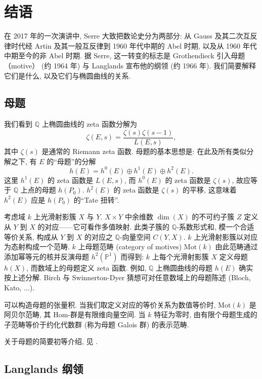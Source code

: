 \section{结语}\label{sec:5.10}

在 2017 年的一次演讲中, Serre 大致把数论史分为两部分: 从 Gauss 及其二次互反律时代经 Artin 及其一般互反律到 1960 年代中期的 Abel 时期, 以及从 1960 年代中期至今的非 Abel 时期. 据 Serre, 这一转变的标志是 Grothendieck 引入母题（motive） (约 1964 年) 与 Langlands 宣布他的纲领 (约 1966 年). 我们简要解释它们是什么, 以及它们与椭圆曲线的关系.

\subsection*{母题}

我们看到 $\mathbb{Q}$ 上椭圆曲线的 zeta 函数分解为
\[
\zeta(E, s) = \frac{\zeta(s)\zeta(s-1)}{L(E, s)},
\]
其中 $\zeta(s)$ 是通常的 Riemann zeta 函数. 母题的基本思想是: 在此及所有类似分解之下, 有 $E$ 的``母题''的分解
\[
h(E) = h^0(E)\oplus h^1(E)\oplus h^2(E).
\]
这里 $h^1(E)$ 的 zeta 函数是 $L(E, s)$, 而 $h^0(E)$ 的 zeta 函数是 $\zeta(s)$, 故应等于 $\mathbb{Q}$ 上点的母题 $h(P_0)$. $h^2(E)$ 的 zeta 函数是 $\zeta(s)$ 的平移, 这意味着 $h^2(E)$ 应是 $h(P_0)$ 的``Tate 扭转''.

考虑域 $k$ 上光滑射影簇 $X$ 与 $Y$. $X\times Y$ 中余维数 $\dim(X)$ 的不可约子簇 $Z$ 定义从 $Y$ 到 $X$ 的对应——它可看作多值映射. 此类子簇的 $\mathbb{Q}$-系数形式和, 模一个合适等价关系, 构成从 $Y$ 到 $X$ 的对应之 $\mathbb{Q}$-向量空间 $C(Y, X)$. $k$ 上光滑射影簇以对应为态射构成一个范畴. $k$ 上母题范畴 (category of motives) $\mathrm{Mot}(k)$ 由此范畴通过添加幂等元的核并反演母题 $h^2(\mathbb{P}^1)$ 而得到: $k$ 上每个光滑射影簇 $X$ 定义母题 $h(X)$, 而数域上的母题定义 zeta 函数. 例如, $\mathbb{Q}$ 上椭圆曲线的母题 $h(E)$ 确实按上述分解. Birch 与 Swinnerton-Dyer 猜想可对任意数域上的母题陈述 (Bloch, Kato, $\dots$).

可以构造母题的张量积. 当我们取定义对应的等价关系为数值等价时, $\mathrm{Mot}(k)$ 是 阿贝尔范畴, 其 Hom-群是有限维向量空间. 当 $k$ 特征为零时, 由有限个母题生成的子范畴等价于约化代数群 (称为母题 Galois 群) 的表示范畴.

关于母题的简要初等介绍, 见 \cite{milne2013}.

\subsection*{Langlands 纲领}

